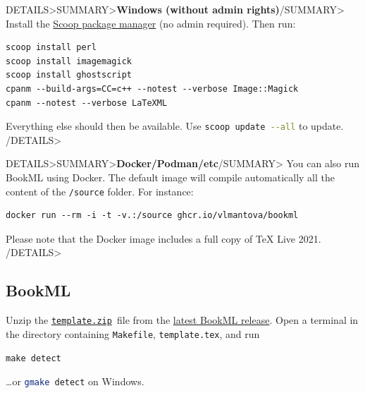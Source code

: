 \documentclass[a4paper,british]{article}
\newenvironment{foldedframe}[1][]{%
    \<DETAILS>\<SUMMARY>\textbf{#1}\</SUMMARY>}%
  {\</DETAILS>}
\newenvironment{foldedframe}[1][]{\bgroup\colorlet{TFFrameColor}{SpringGreen}
  \colorlet{TFTitleColor}{black}\begin{titled-frame}{#1}}{\end{titled-frame}\egroup}
\def\cmdinline{\lstinline[language=bash,frame=none]}
\begin{document}
\begin{foldedframe}[Windows (without admin rights)]
  Install the \href{https://scoop.sh/}{Scoop package manager} (no admin required). Then run:
  \begin{lstlisting}
scoop install perl
scoop install imagemagick
scoop install ghostscript
cpanm --build-args=CC=c++ --notest --verbose Image::Magick
cpanm --notest --verbose LaTeXML
    \end{lstlisting}
  Everything else should then be available. Use \cmdinline|scoop update --all| to update.
\end{foldedframe}

\begin{foldedframe}[Docker/Podman/etc]
  You can also run BookML using Docker. The default image will compile automatically all the content of the \texttt{/source} folder. For instance:
  \begin{lstlisting}
docker run --rm -i -t -v.:/source ghcr.io/vlmantova/bookml
  \end{lstlisting}
  Please note that the Docker image includes a full copy of TeX Live 2021.
\end{foldedframe}

\subsection{BookML}

Unzip the \texttt{\href{https://github.com/vlmantova/bookml/releases/latest/download/template.zip}{template.zip} }file from the \href{https://github.com/vlmantova/bookml/releases/latest}{latest BookML release}. Open a terminal in the directory containing \texttt{Makefile}, \texttt{template.tex}, and run
\begin{lstlisting}
make detect
\end{lstlisting}
\dots or \cmdinline|gmake detect| on Windows.
\end{document}
